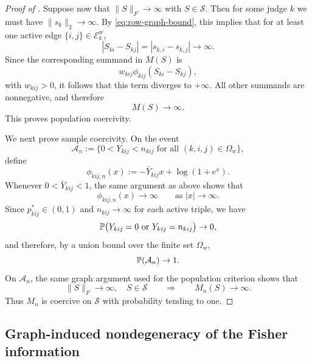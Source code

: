 \documentclass{article}
\begin{document}
\begin{bibunit}[unsrtnat]
\begin{proof}[Proof of ]
Suppose now that $\|S\|_F\to\infty$ with $S\in\mathcal S$. Then for some judge $k$ we must have $\|s_k\|_2\to\infty$. By \eqref{eq:row-graph-bound}, this implies that for at least one active edge $\{i,j\}\in\mathcal E_k^w$,
\[
|S_{ki}-S_{kj}|=|s_{k,i}-s_{k,j}|\to\infty.
\]
Since the corresponding summand in $M(S)$ is
\[
w_{kij}\phi_{kij}(S_{ki}-S_{kj}),
\]
with $w_{kij}>0$, it follows that this term diverges to $+\infty$. All other summands are nonnegative, and therefore
\[
M(S)\to\infty.
\]
This proves population coercivity.

We next prove sample coercivity. On the event
\[
\mathcal A_n:=\{0<Y_{kij}<n_{kij}\text{ for all }(k,i,j)\in\Omega_w\},
\]
define
\[
\phi_{kij,n}(x):=-\bar Y_{kij}x+\log(1+e^x).
\]
Whenever $0<\bar Y_{kij}<1$, the same argument as above shows that
\[
\phi_{kij,n}(x)\to\infty
\qquad\text{as }|x|\to\infty.
\]
Since $p_{kij}^\ast\in(0,1)$ and $n_{kij}\to\infty$ for each active triple, we have
\[
\mathbb{P}\bigl(Y_{kij}=0 \text{ or } Y_{kij}=n_{kij}\bigr)\to 0,
\]
and therefore, by a union bound over the finite set $\Omega_w$,
\[
\mathbb{P}(\mathcal A_n)\to1.
\]
On $\mathcal A_n$, the same graph argument used for the population criterion shows that
\[
\|S\|_F\to\infty,\quad S\in\mathcal S
\qquad\Longrightarrow\qquad
M_n(S)\to\infty.
\]
Thus $M_n$ is coercive on $\mathcal S$ with probability tending to one.
\end{proof}


\subsection{Graph-induced nondegeneracy of the Fisher information}
\label{app:graph_fisher_nondegenerate}


\end{bibunit}
\end{document}
